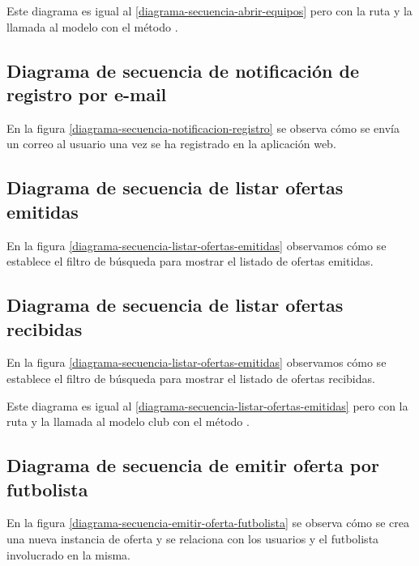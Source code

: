 Este diagrama es igual al \ref{diagrama-secuencia-abrir-equipos} pero con la
ruta  y la llamada al modelo con el método
.


\subsection*{Diagrama de secuencia de notificación de registro por e-mail}
En la figura \ref{diagrama-secuencia-notificacion-registro} se observa cómo se
envía un correo al usuario una vez se ha registrado en la aplicación web.



\subsection*{Diagrama de secuencia de listar ofertas emitidas}
En la figura \ref{diagrama-secuencia-listar-ofertas-emitidas} observamos cómo se
establece el filtro de búsqueda para mostrar el listado de ofertas emitidas.


\subsection*{Diagrama de secuencia de listar ofertas recibidas}
En la figura \ref{diagrama-secuencia-listar-ofertas-emitidas} observamos cómo se
establece el filtro de búsqueda para mostrar el listado de ofertas recibidas.

Este diagrama es igual al \ref{diagrama-secuencia-listar-ofertas-emitidas} pero
con la ruta  y la llamada al modelo club con
el método .

\subsection*{Diagrama de secuencia de emitir oferta por futbolista}
En la figura \ref{diagrama-secuencia-emitir-oferta-futbolista} se observa cómo
se crea una nueva instancia de oferta y se relaciona con los usuarios y el
futbolista involucrado en la misma.

